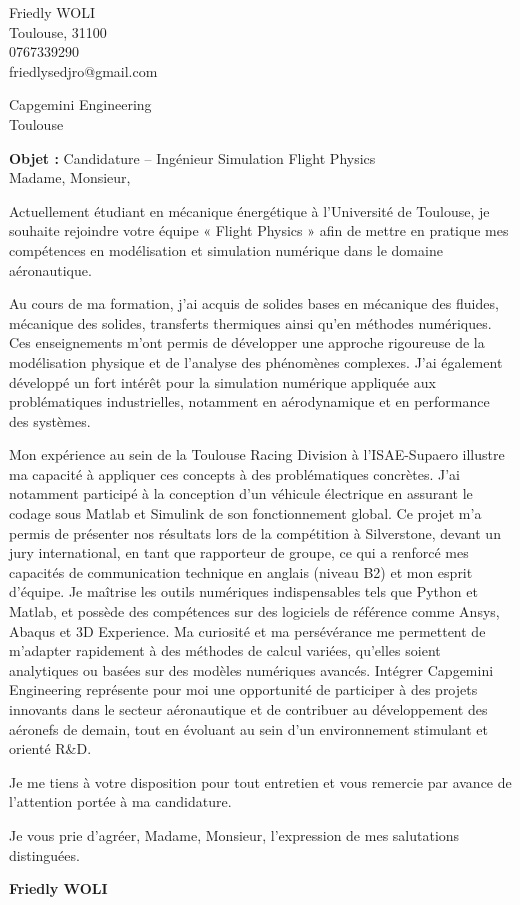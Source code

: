 \documentclass[11pt,a4paper]{article}
\begin{document}
	\pagestyle{empty}
	
	\noindent
	Friedly WOLI \\
	Toulouse, 31100 \\
	0767339290 \\
	friedlysedjro@gmail.com 
	
	\begin{flushright}
		Capgemini Engineering \\
		Toulouse
	\end{flushright}
	
	\bigskip
	
	\textbf{Objet :} Candidature – Ingénieur Simulation Flight Physics \\
	
	Madame, Monsieur,
	
	Actuellement étudiant en mécanique énergétique à l’Université de Toulouse, je souhaite rejoindre votre équipe « Flight Physics » afin de mettre en pratique mes compétences en modélisation et simulation numérique dans le domaine aéronautique.
	
	Au cours de ma formation, j’ai acquis de solides bases en mécanique des fluides, mécanique des solides, transferts thermiques ainsi qu’en méthodes numériques. Ces enseignements m’ont permis de développer une approche rigoureuse de la modélisation physique et de l’analyse des phénomènes complexes. J’ai également développé un fort intérêt pour la simulation numérique appliquée aux problématiques industrielles, notamment en aérodynamique et en performance des systèmes.
	
	Mon expérience au sein de la Toulouse Racing Division à l'ISAE-Supaero illustre ma capacité à appliquer ces concepts à des problématiques concrètes. J’ai notamment participé à la conception d’un véhicule électrique en assurant le codage sous Matlab et Simulink de son fonctionnement global. Ce projet m’a permis de présenter nos résultats lors de la compétition à Silverstone, devant un jury international, en tant que rapporteur de groupe, ce qui a renforcé mes capacités de communication technique en anglais (niveau B2) et mon esprit d'équipe.
	Je maîtrise les outils numériques indispensables tels que Python et Matlab, et possède des compétences sur des logiciels de référence comme Ansys, Abaqus et 3D Experience. Ma curiosité et ma persévérance me permettent de m'adapter rapidement à des méthodes de calcul variées, qu'elles soient analytiques ou basées sur des modèles numériques avancés.
	Intégrer Capgemini Engineering représente pour moi une opportunité de participer à des projets innovants dans le secteur aéronautique et de contribuer au développement des aéronefs de demain, tout en évoluant au sein d’un environnement stimulant et orienté R\&D.
	
	Je me tiens à votre disposition pour tout entretien et vous remercie par avance de l’attention portée à ma candidature.
	
	Je vous prie d’agréer, Madame, Monsieur, l’expression de mes salutations distinguées.
	
	\vspace{0.8cm}
	
	\begin{flushright}
		\textbf{Friedly WOLI}
	\end{flushright}
	
\end{document}
